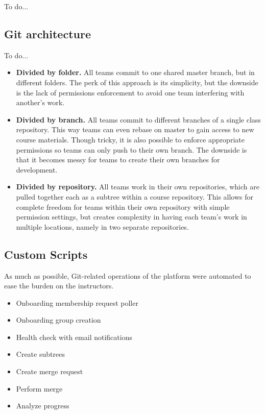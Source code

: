 \documentclass[12pt,twoside,vi]{mitthesis}
\newcommand{\wip}[1]{{\color{red} To do...}}
\begin{document}
\wip{DigitalOcean droplet https://www.digitalocean.com/community/tutorials/how-to-install-and-configure-gitlab-on-ubuntu-16-04 
GitLab [built in for DO]
NameCheap domain and networking
nginx customization
Lets encrypt}

\subsection{Git architecture}

\wip{motivate this}

\begin{itemize}
\item \textbf{Divided by folder.} All teams commit to one shared master branch, but in different folders. The perk of this approach is its simplicity, but the downside is the lack of permissions enforcement to avoid one team interfering with another’s work.
\item \textbf{Divided by branch.} All teams commit to different branches of a single class repository. This way teams can even rebase on master to gain access to new course materials. Though tricky, it is also possible to enforce appropriate permissions so teams can only push to their own branch. The downside is that it becomes messy for teams to create their own branches for development.
\item \textbf{Divided by repository.} All teams work in their own repositories, which are pulled together each as a subtree within a course repository. This allows for complete freedom for teams within their own repository with simple permission settings, but creates complexity in having each team’s work in multiple locations, namely in two separate repositories. 
\end{itemize}

\subsection{Custom Scripts}

As much as possible, Git-related operations of the platform were automated to ease the burden on the instructors. 
\begin{itemize}
\item Onboarding membership request poller
\item Onboarding group creation
\item Health check with email notifications
\item Create subtrees
\item Create merge request
\item Perform merge
\item Analyze progress
\end{itemize}
\end{document}
